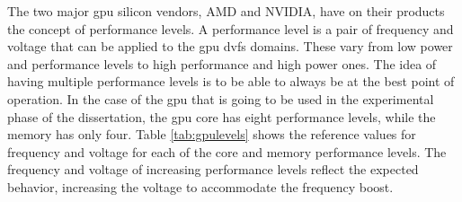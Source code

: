 The two major \acrshort{gpu} silicon vendors, AMD and NVIDIA, have on their products the concept of performance levels. A performance level is a pair of frequency and voltage that can be applied to the \acrshort{gpu} \acrshort{dvfs} domains. These vary from low power and performance levels to high performance and high power ones. The idea of having multiple performance levels is to be able to always be at the best point of operation.  In the case of the \acrshort{gpu} that is going to be used in the experimental phase of the dissertation, the \acrshort{gpu} core has eight performance levels, while the memory has only four. Table \ref{tab:gpulevels} shows the reference values for frequency and voltage for each of the core and memory performance levels. The frequency and voltage of increasing performance levels reflect the expected behavior, increasing the voltage to accommodate the frequency boost.

